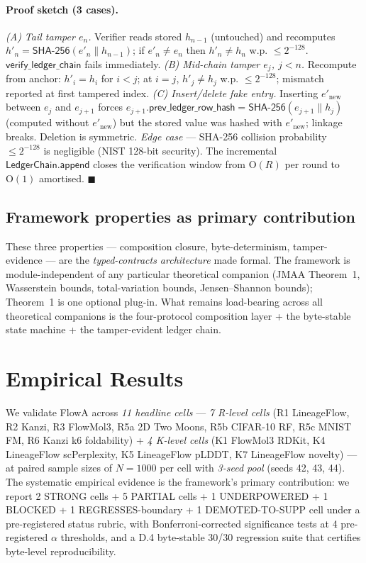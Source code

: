 \documentclass[journal,twocolumn,final]{IEEEtran}
\begin{document}
\paragraph{Proof sketch (3 cases).}
\emph{(A) Tail tamper $e_n$.} Verifier reads stored $h_{n-1}$ (untouched)
and recomputes $h'_n = \mathsf{SHA\text{-}256}(e'_n \parallel h_{n-1})$; if
$e'_n \ne e_n$ then $h'_n \ne h_n$ w.p. $\le 2^{-128}$.
$\mathsf{verify\_ledger\_chain}$ fails immediately. \emph{(B) Mid-chain tamper
$e_j$, $j < n$.} Recompute from anchor: $h'_i = h_i$ for $i < j$; at $i = j$,
$h'_j \ne h_j$ w.p. $\le 2^{-128}$; mismatch reported at first tampered index.
\emph{(C) Insert/delete fake entry.} Inserting $e'_\mathrm{new}$ between $e_j$
and $e_{j+1}$ forces $e_{j+1}.\mathsf{prev\_ledger\_row\_hash} =
\mathsf{SHA\text{-}256}(e_{j+1} \parallel h_j)$ (computed without $e'_\mathrm{new}$)
but the stored value was hashed with $e'_\mathrm{new}$; linkage breaks.
Deletion is symmetric. \emph{Edge case} --- SHA-256 collision probability
$\le 2^{-128}$ is negligible (NIST 128-bit security). The incremental
$\mathsf{LedgerChain.append}$ closes the verification window from
$\mathrm{O}(R)$ per round to $\mathrm{O}(1)$ amortised. $\blacksquare$

\subsection{Framework properties as primary contribution}

These three properties --- composition closure, byte-determinism,
tamper-evidence --- are the \emph{typed-contracts architecture} made formal.
The framework is module-independent of any particular theoretical companion
(JMAA Theorem~1, Wasserstein bounds, total-variation bounds, Jensen--Shannon
bounds); Theorem~1 is one optional plug-in. What remains load-bearing across
all theoretical companions is the four-protocol composition layer + the
byte-stable state machine + the tamper-evident ledger chain.

\section{Empirical Results}\label{sec:empirical}

We validate FlowA across \emph{11 headline cells} --- \emph{7 R-level cells}
(R1 LineageFlow, R2 Kanzi, R3 FlowMol3, R5a 2D Two Moons, R5b CIFAR-10 RF,
R5c MNIST FM, R6 Kanzi k6 foldability) + \emph{4 K-level cells} (K1 FlowMol3
RDKit, K4 LineageFlow scPerplexity, K5 LineageFlow pLDDT, K7 LineageFlow
novelty) --- at paired sample sizes of $N = 1000$ per cell with \emph{3-seed
pool} (seeds 42, 43, 44). The systematic empirical evidence is the
framework's primary contribution: we report 2 STRONG cells + 5 PARTIAL cells
+ 1 UNDERPOWERED + 1 BLOCKED + 1 REGRESSES-boundary + 1 DEMOTED-TO-SUPP cell
under a pre-registered status rubric, with Bonferroni-corrected significance
tests at 4 pre-registered $\alpha$ thresholds, and a D.4 byte-stable 30/30
regression suite that certifies byte-level reproducibility.
\end{document}
